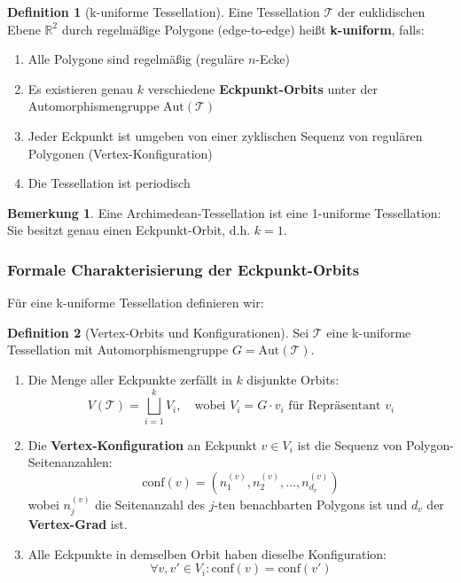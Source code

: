 \documentclass[a4paper,12pt]{article}
\theoremstyle{definition}
\newtheorem{definition}{Definition}[section]
\newtheorem{bemerkung}{Bemerkung}[section]
\begin{document}
\begin{definition}[k-uniforme Tessellation]\label{def:kuniform}
	Eine Tessellation $\mathcal{T}$ der euklidischen Ebene $\mathbb{R}^2$ durch regelmäßige Polygone (edge-to-edge) heißt \textbf{k-uniform}, falls:
	\begin{enumerate}
		\item Alle Polygone sind regelmäßig (reguläre $n$-Ecke)
		\item Es existieren genau $k$ verschiedene \textbf{Eckpunkt-Orbits} unter der Automorphismengruppe $\text{Aut}(\mathcal{T})$
		\item Jeder Eckpunkt ist umgeben von einer zyklischen Sequenz von regulären Polygonen (Vertex-Konfiguration)
		\item Die Tessellation ist periodisch
	\end{enumerate}
\end{definition}

\begin{bemerkung}
	Eine Archimedean-Tessellation ist eine 1-uniforme Tessellation: Sie besitzt genau einen Eckpunkt-Orbit, d.h. $k=1$.
\end{bemerkung}

\subsubsection{Formale Charakterisierung der Eckpunkt-Orbits}

Für eine k-uniforme Tessellation definieren wir:

\begin{definition}[Vertex-Orbits und Konfigurationen]
	Sei $\mathcal{T}$ eine k-uniforme Tessellation mit Automorphismengruppe $G = \text{Aut}(\mathcal{T})$.
	
	\begin{enumerate}
		\item Die Menge aller Eckpunkte zerfällt in $k$ disjunkte Orbits:
		\[
		V(\mathcal{T}) = \bigsqcup_{i=1}^{k} V_i, \quad \text{wobei } V_i = G \cdot v_i \text{ für Repräsentant } v_i
		\]
		
		\item Die \textbf{Vertex-Konfiguration} an Eckpunkt $v \in V_i$ ist die Sequenz von Polygon-Seitenanzahlen:
		\[
		\text{conf}(v) = (n_1^{(v)}, n_2^{(v)}, \ldots, n_{d_v}^{(v)})
		\]
		wobei $n_j^{(v)}$ die Seitenanzahl des $j$-ten benachbarten Polygons ist und $d_v$ der \textbf{Vertex-Grad} ist.
		
		\item Alle Eckpunkte in demselben Orbit haben dieselbe Konfiguration:
		\[
		\forall v, v' \in V_i: \text{conf}(v) = \text{conf}(v')
		\]
	\end{enumerate}
\end{definition}
\end{document}
